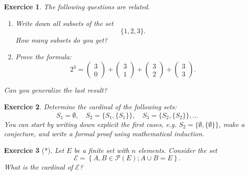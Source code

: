\documentclass[
	fontsize=10pt, %
	twoside=true, %
	secnumdepth=1, %
	numbers=noenddot, %
]{kaobook}
\newtheorem{exer}{Exercice}[chapter]
\begin{document}
\begin{exer}
The following questions are related.
\begin{enumerate}
	\item Write down all subsets of the set
	\begin{equation*}
	\{1,2,3\}.
	\end{equation*}
	How many subsets do you get?
	\item Prove the formula:
	\begin{equation*}
	2^{3}=\begin{pmatrix}3\\0\end{pmatrix}+\begin{pmatrix}3\\1\end{pmatrix}+\begin{pmatrix}3\\2\end{pmatrix}+\begin{pmatrix}3\\3\end{pmatrix}.
	\end{equation*}
\end{enumerate}
Can you generalize the last result?
\end{exer}

\begin{exer}
Determine the cardinal of the following sets:
\begin{equation*}
S_1=\emptyset,\quad S_2=\{S_1,\{S_1\}\},\quad S_3=\{S_2,\{S_2\}\}, \dots
\end{equation*}
You can start by writing down explicit the first cases, e.g. $S_2=\{\emptyset,\{\emptyset\}\}$, make a conjecture, and write a formal proof using mathematical induction.
\end{exer}

\begin{exer}[$\ast$]
Let $E$ be a finite set with $n$ elements. Consider the set
\begin{equation*}
\mathcal{E}=\left\{A,B\in\mathcal{P}(E); A\cup B=E\right\}.
\end{equation*}
What is the cardinal of $\mathcal{E}$?
\end{exer}
\end{document}
